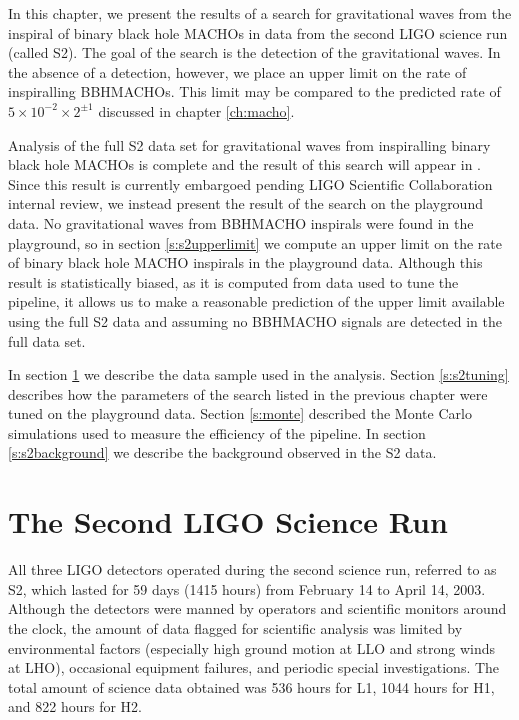 
In this chapter, we present the results of a search for gravitational waves
from the inspiral of binary black hole MACHOs in data from the second LIGO
science run (called S2).  The goal of the search is the
detection of the gravitational waves. In the absence of a detection, however, we
place an upper limit on the rate of inspiralling BBHMACHOs. This
limit may be compared to the predicted rate of $5 \times 10^{-2} \times
2^{\pm 1}$ discussed in chapter \ref{ch:macho}.  

Analysis of the full S2 data set for gravitational waves from inspiralling
binary black hole MACHOs is complete and the result of this search will appear
in \cite{S2Macho:2004}. Since this result is currently embargoed pending LIGO
Scientific Collaboration internal review, we instead present the result of the
search on the playground data. No gravitational waves from BBHMACHO inspirals
were found in the playground, so in section \ref{s:s2upperlimit} we compute an
upper limit on the rate of binary black hole MACHO inspirals in the playground
data.  Although this result is statistically biased, as it is computed from
data used to tune the pipeline, it allows us to make a reasonable prediction
of the upper limit available using the full S2 data and assuming no BBHMACHO
signals are detected in the full data set.

In section \ref{s:s2run} we describe the data sample used in the analysis.
Section \ref{s:s2tuning} describes how the parameters of the search listed in
the previous chapter were tuned on the playground data. Section \ref{s:monte}
described the Monte Carlo simulations used to measure the efficiency of the
pipeline. In section \ref{s:s2background} we describe the background observed
in the S2 data.


\section{The Second LIGO Science Run}
\label{s:s2run}

All three LIGO detectors operated during the second science run, referred to
as S2, which lasted for 59 days (1415 hours) from February 14 to April 14,
2003.  Although the detectors were manned by operators and scientific monitors
around the clock, the amount of data flagged for scientific analysis was
limited by environmental factors (especially high ground motion at LLO and
strong winds at LHO), occasional equipment failures, and periodic special
investigations.  The total amount of science data obtained was 536 hours for
L1, 1044 hours for H1, and 822 hours for H2.

